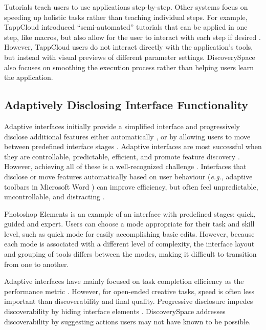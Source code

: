Tutorials teach users to use applications step-by-step. Other systems focus on speeding up holistic tasks rather than teaching individual steps. For example, TappCloud introduced ``semi-automated'' tutorials that can be applied in one step, like macros, but also allow for the user to interact with each step if desired \cite{Laput2012}. However, TappCloud users do not interact directly with the application's tools, but instead with visual previews of different parameter settings. Discovery\-Space also focuses on smoothing the execution process rather than helping users learn the application.

\subsection{Adaptively Disclosing Interface Functionality}
Adaptive interfaces initially provide a simplified interface and progressively disclose additional features either automatically \cite{Gajos2006, McGrenere2002, Paymans2004}, or by allowing users to move between predefined interface stages \cite{Carroll1984, Leung2010, McGrenere2002, Shneiderman2000}. Adaptive interfaces are most successful when they are controllable, predictable, efficient, and promote feature discovery \cite{MM-gi2000, Shneiderman2002a}. However, achieving all of these is a well-recognized challenge \cite{Findlater2010, McGrenere2002}. Interfaces that disclose or move features automatically based on user behaviour (\textit{e.g.}, adaptive toolbars in Microsoft Word \cite{Gajos2006}) can improve efficiency, but often feel unpredictable, uncontrollable, and distracting \cite{Gajos2006, Paymans2004, Shneiderman2002a}.

Photoshop Elements is an example of an interface with predefined stages: quick, guided and expert. Users can choose a mode appropriate for their task and skill level, such as quick mode for easily accomplishing basic edits. However, because each mode is associated with a different level of complexity, the interface layout and grouping of tools differs between the modes, making it difficult to transition from one to another.

Adaptive interfaces have mainly focused on task completion efficiency as the performance metric \cite{Gajos2006, Leung2010}. However, for open-ended creative tasks, speed is often less important than discoverability and final quality. Progressive disclosure impedes discoverability by hiding interface elements \cite{Findlater2010}. Discovery\-Space addresses discoverability by suggesting actions users may not have known to be possible.

